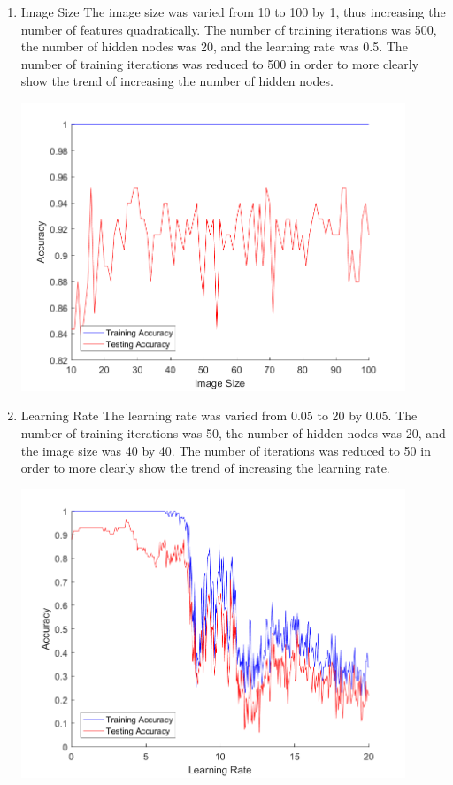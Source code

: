 \documentclass[12pt]{article}
\begin{document}
\begin{enumerate}
\begin{center}
    \label{fig:num_hidden_nodes}
  \end{center}
  \item Image Size
  The image size was varied from 10 to 100 by 1, thus increasing the number of features quadratically. The number of training iterations was 500, the number of hidden nodes was 20, and the learning rate was 0.5. The number of training iterations was reduced to 500 in order to more clearly show the trend of increasing the number of hidden nodes.
  \begin{center}
    \includegraphics[width=115mm]{./accuracy_imgs/image_size_empirical.png}
    \label{fig:img_size}
  \end{center}
  \item Learning Rate
  The learning rate was varied from 0.05 to 20 by 0.05. The number of training iterations was 50, the number of hidden nodes was 20, and the image size was 40 by 40. The number of iterations was reduced to 50 in order to more clearly show the trend of increasing the learning rate.
  \begin{center}
    \includegraphics[width=115mm]{./accuracy_imgs/learning_rate_empirical.png}

\end{center}
\end{enumerate}
\end{document}
